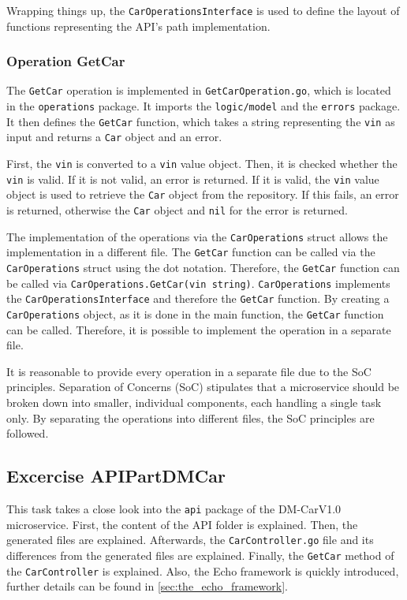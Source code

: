 Wrapping things up, the \texttt{CarOperationsInterface} is used to define the layout of functions representing the API's path implementation.

\subsubsection*{Operation GetCar}
The \texttt{GetCar} operation is implemented in \texttt{GetCarOperation.go}, which is located in the \texttt{operations} package.
It imports the \texttt{logic/model} and the \texttt{errors} package.
It then defines the \texttt{GetCar} function, which takes a string representing the \texttt{vin} as input and returns a \texttt{Car} object and an error.

First, the \texttt{vin} is converted to a \texttt{vin} value object.
Then, it is checked whether the \texttt{vin} is valid.
If it is not valid, an error is returned.
If it is valid, the \texttt{vin} value object is used to retrieve the \texttt{Car} object from the repository.
If this fails, an error is returned, otherwise the \texttt{Car} object and \texttt{nil} for the error is returned.

The implementation of the operations via the \texttt{CarOperations} struct allows the implementation in a different file.
The \texttt{GetCar} function can be called via the \texttt{CarOperations} struct using the dot notation.
Therefore, the \texttt{GetCar} function can be called via \hfill \linebreak \texttt{CarOperations.GetCar(vin string)}.
\texttt{CarOperations} implements the \hfill \linebreak \texttt{CarOperationsInterface} and therefore the \texttt{GetCar} function.
By creating a \texttt{CarOperations} object, as it is done in the main function, the \texttt{GetCar} function can be called.
Therefore, it is possible to implement the operation in a separate file.

It is reasonable to provide every operation in a separate file due to the SoC principles.
Separation of Concerns (SoC) stipulates that a microservice should be broken down into smaller, individual components, each handling a single task only.
By separating the operations into different files, the SoC principles are followed.
\subsection{Excercise APIPartDMCar}
This task takes a close look into the \texttt{api} package of the DM-CarV1.0 microservice.
First, the content of the API folder is explained.
Then, the generated files are explained.
Afterwards, the \texttt{CarController.go} file and its differences from the generated files are explained.
Finally, the \texttt{GetCar} method of the \texttt{CarController} is explained.
Also, the Echo framework is quickly introduced, further details can be found in \autoref{sec:the_echo_framework}.
